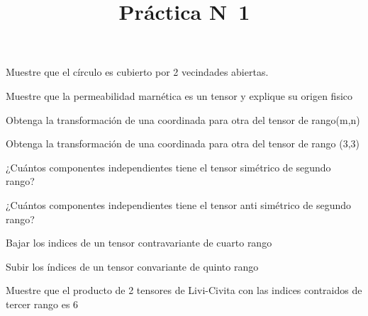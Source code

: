 \documentclass[12pt,a4paper]{practice}
\begin{document}
    \title{Práctica N\textdegree\ 1}
    \maketitle

   \begin{problem}\label{prob:1}
        Muestre que el círculo es cubierto por 2 vecindades abiertas.
    \end{problem}

    \begin{problem}\label{prob:2}
        Muestre que la permeabilidad marnética es un tensor y explique su origen fisico    
    \end{problem}
    
    \begin{problem}\label{prob:3}
        Obtenga la transformación de una coordinada para otra del tensor de rango(m,n)    
    \end{problem}
    
    \begin{problem}\label{prob:4}
        Obtenga la transformación de una coordinada para otra del tensor de rango (3,3)
    \end{problem}

    \begin{problem}\label{prob:5}
        ¿Cuántos componentes independientes tiene el tensor simétrico de segundo rango?    
    \end{problem}

    \begin{problem}\label{prob:6}
        ¿Cuántos componentes independientes tiene el tensor anti simétrico de segundo rango?    
    \end{problem}
    
    \begin{problem}\label{prob:7}
        Bajar los indices de un tensor contravariante de cuarto rango    
    \end{problem}
    
    \begin{problem}\label{prob:8}
        Subir los índices de un tensor convariante de quinto rango
    \end{problem}

    \begin{problem}\label{prob:9}
        Muestre que el producto de 2 tensores de Livi-Civita con las indices contraidos de tercer rango es 6
    \end{problem}
\end{document}
